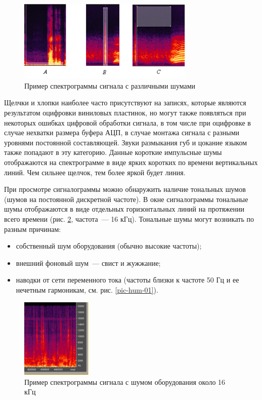 \documentclass[oneside, final, 14pt]{extreport}
\begin{document}
\begin{figure}[h!]
\centering
\includegraphics[width=0.75\textwidth]{pic-spectrogram-02}
\caption{Пример спектрограммы сигнала с различными шумами}
\label{pic-spectrogram-02}
\end{figure}

Щелчки и хлопки наиболее часто присутствуют на записях, которые являются результатом оцифровки виниловых пластинок, но могут также появляться при некоторых ошибках цифровой обработки сигнала, в том числе при оцифровке в случае нехватки размера буфера АЦП, в случае монтажа сигнала с разными уровнями постоянной составляющей.
Звуки размыкания губ и цокание языком также попадают в эту категорию. Данные короткие импульсные шумы отображаются на спектрограмме в виде ярких коротких по времени вертикальных линий. Чем сильнее щелчок, тем более яркой будет линия. 

При просмотре сигналограммы можно обнаружить наличие тональных шумов (шумов на постоянной дискретной частоте). В окне сигналограммы тональные шумы отображаются в виде отдельных горизонтальных линий на протяжении всего времени (рис. \ref{pic-spectrogram-03}, частота~--- 16 кГц). Тональные шумы могут возникать по разным причинам:
\begin{itemize}
\item собственный шум оборудования (обычно высокие частоты);
\item внешний фоновый шум~--- свист и жужжание;
\item наводки от сети переменного тока (частоты близки к частоте 50 Гц и ее нечетным гармоникам, см. рис. \ref{pic-hum-01}).
\end{itemize}

\begin{figure}[h!]
\centering
\includegraphics[width=0.3\textwidth]{pic-spectrogram-03}
\caption{Пример спектрограммы сигнала с шумом оборудования около 16 кГц}
\label{pic-spectrogram-03}
\end{figure}
\end{document}
